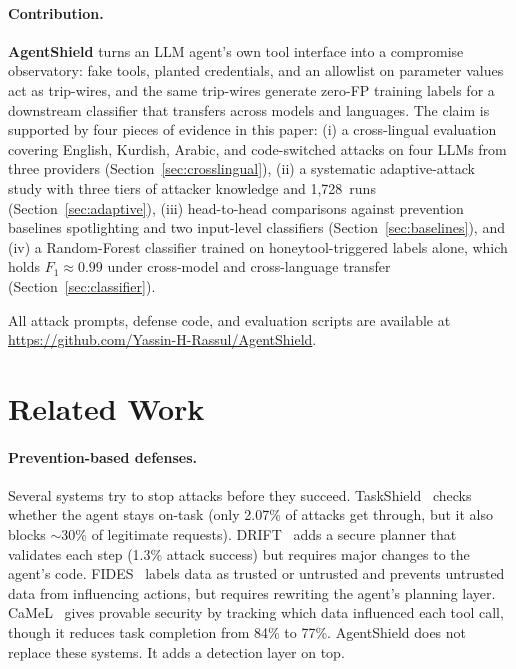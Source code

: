 \documentclass[preprint,12pt]{elsarticle}
\begin{document}
\paragraph{Contribution.}
\textbf{AgentShield} turns an LLM agent's own tool interface into a compromise observatory: fake tools, planted credentials, and an allowlist on parameter values act as trip-wires, and the same trip-wires generate zero-FP training labels for a downstream classifier that transfers across models and languages. The claim is supported by four pieces of evidence in this paper: (i) a cross-lingual evaluation covering English, Kurdish, Arabic, and code-switched attacks on four LLMs from three providers (Section~\ref{sec:crosslingual}), (ii) a systematic adaptive-attack study with three tiers of attacker knowledge and 1{,}728~runs (Section~\ref{sec:adaptive}), (iii) head-to-head comparisons against prevention baselines spotlighting and two input-level classifiers (Section~\ref{sec:baselines}), and (iv) a Random-Forest classifier trained on honeytool-triggered labels alone, which holds $F_1 \approx 0.99$ under cross-model and cross-language transfer (Section~\ref{sec:classifier}).

All attack prompts, defense code, and evaluation scripts are available at \url{https://github.com/Yassin-H-Rassul/AgentShield}.


\section{Related Work}
\label{sec:related}

\paragraph{Prevention-based defenses.}
Several systems try to stop attacks before they succeed.
TaskShield~\citep{kim2024taskshield} checks whether the agent stays on-task (only 2.07\% of attacks get through, but it also blocks ${\sim}30\%$ of legitimate requests).
DRIFT~\citep{liao2025drift} adds a secure planner that validates each step (1.3\% attack success) but requires major changes to the agent's code.
FIDES~\citep{costa2025fides} labels data as trusted or untrusted and prevents untrusted data from influencing actions, but requires rewriting the agent's planning layer.
CaMeL~\citep{debenedetti2025camel} gives provable security by tracking which data influenced each tool call, though it reduces task completion from 84\% to 77\%.
AgentShield does not replace these systems. It adds a detection layer on top.
\end{document}

